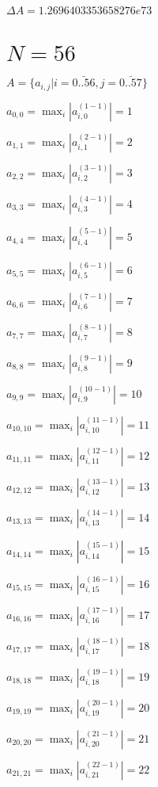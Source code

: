 \documentclass[a4paper,12pt]{article}
\begin{document}
$\Delta A = 1.2696403353658276e73$



\section{ $N = 56$ }
$A = \{ a _{ i, j } | i = \bar { 0..56 }, j = \bar { 0..57 } \}$

$a _{ 0, 0 } =  \max _i |a _{ i, 0 } ^{ (1 - 1) } | = 1$

$a _{ 1, 1 } =  \max _i |a _{ i, 1 } ^{ (2 - 1) } | = 2$

$a _{ 2, 2 } =  \max _i |a _{ i, 2 } ^{ (3 - 1) } | = 3$

$a _{ 3, 3 } =  \max _i |a _{ i, 3 } ^{ (4 - 1) } | = 4$

$a _{ 4, 4 } =  \max _i |a _{ i, 4 } ^{ (5 - 1) } | = 5$

$a _{ 5, 5 } =  \max _i |a _{ i, 5 } ^{ (6 - 1) } | = 6$

$a _{ 6, 6 } =  \max _i |a _{ i, 6 } ^{ (7 - 1) } | = 7$

$a _{ 7, 7 } =  \max _i |a _{ i, 7 } ^{ (8 - 1) } | = 8$

$a _{ 8, 8 } =  \max _i |a _{ i, 8 } ^{ (9 - 1) } | = 9$

$a _{ 9, 9 } =  \max _i |a _{ i, 9 } ^{ (10 - 1) } | = 10$

$a _{ 10, 10 } =  \max _i |a _{ i, 10 } ^{ (11 - 1) } | = 11$

$a _{ 11, 11 } =  \max _i |a _{ i, 11 } ^{ (12 - 1) } | = 12$

$a _{ 12, 12 } =  \max _i |a _{ i, 12 } ^{ (13 - 1) } | = 13$

$a _{ 13, 13 } =  \max _i |a _{ i, 13 } ^{ (14 - 1) } | = 14$

$a _{ 14, 14 } =  \max _i |a _{ i, 14 } ^{ (15 - 1) } | = 15$

$a _{ 15, 15 } =  \max _i |a _{ i, 15 } ^{ (16 - 1) } | = 16$

$a _{ 16, 16 } =  \max _i |a _{ i, 16 } ^{ (17 - 1) } | = 17$

$a _{ 17, 17 } =  \max _i |a _{ i, 17 } ^{ (18 - 1) } | = 18$

$a _{ 18, 18 } =  \max _i |a _{ i, 18 } ^{ (19 - 1) } | = 19$

$a _{ 19, 19 } =  \max _i |a _{ i, 19 } ^{ (20 - 1) } | = 20$

$a _{ 20, 20 } =  \max _i |a _{ i, 20 } ^{ (21 - 1) } | = 21$

$a _{ 21, 21 } =  \max _i |a _{ i, 21 } ^{ (22 - 1) } | = 22$
\end{document}
